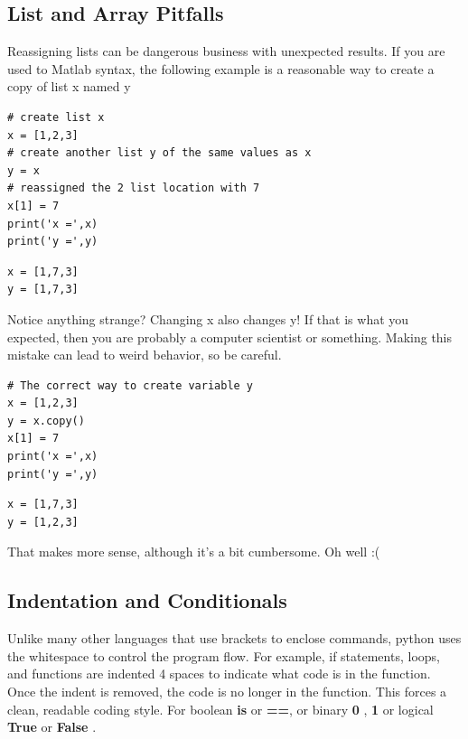 \documentclass[%
oneside,                 %
final,                   %
10pt]{article}
\begin{document}
\subsection{List and Array Pitfalls}

Reassigning lists can be dangerous business with unexpected results. If you are used to Matlab syntax, the following example is a reasonable way to create a copy of list x named y

\begin{Verbatim}[numbers=none,fontsize=\fontsize{9pt}{9pt},baselinestretch=0.95,xleftmargin=2mm]
# create list x
x = [1,2,3]
# create another list y of the same values as x
y = x
# reassigned the 2 list location with 7
x[1] = 7
print('x =',x)
print('y =',y)
\end{Verbatim}

\begin{Verbatim}[numbers=none,fontsize=\fontsize{9pt}{9pt},baselinestretch=0.95,xleftmargin=2mm]
x = [1,7,3]
y = [1,7,3]
\end{Verbatim}



Notice anything strange? Changing x also changes y! If that is what you expected, then you are probably a computer scientist or something. Making this mistake can lead to weird behavior, so be careful.


\begin{Verbatim}[numbers=none,fontsize=\fontsize{9pt}{9pt},baselinestretch=0.95,xleftmargin=2mm]
# The correct way to create variable y
x = [1,2,3]
y = x.copy()
x[1] = 7
print('x =',x)
print('y =',y)
\end{Verbatim}

\begin{Verbatim}[numbers=none,fontsize=\fontsize{9pt}{9pt},baselinestretch=0.95,xleftmargin=2mm]
x = [1,7,3]
y = [1,2,3]
\end{Verbatim}

That makes more sense, although it's a bit cumbersome. Oh well :(

\subsection{Indentation and Conditionals}

Unlike many other languages that use brackets to enclose commands, python uses the whitespace to control the program flow. For example, if statements, loops, and functions are indented 4 spaces to indicate what code is in the function. Once the indent is removed, the code is no longer in the function. This forces a clean, readable coding style. For boolean \textbf{is} or \textbf{==}, or binary \textbf{0} , \textbf{1} or logical \textbf{True} or \textbf{False} .
\end{document}

